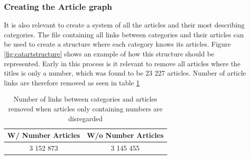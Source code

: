 \subsubsection{Creating the Article graph}
It is also relevant to create a system of all the articles and their most describing categories. The file containing all links between categories and their articles can be used to create a structure where each category knows its articles. Figure \ref{fig:catartstructure} shows an example of how this structure should be represented. Early in this process is it relevant to remove all articles where the titles is only a number, which was found to be  23 227 articles. Number of article links are therefore removed as seen in table \ref{tab:withoutnumber}

\begin{table}[h]
\centering
\begin{tabular}{c|c}
\textbf{W/ Number Articles} & \textbf{W/o Number Articles}  \\ \hline
 3 152 873 & 3 145 455
\end{tabular}
\caption[Number of links without number articles]{Number of links between categories and articles removed when articles only containing numbers are disregarded}
\label{tab:withoutnumber}
\end{table}


